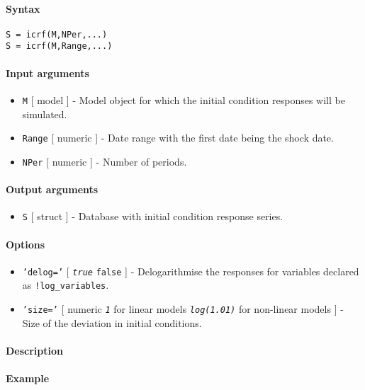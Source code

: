 


	\paragraph{Syntax}

\begin{verbatim}
S = icrf(M,NPer,...)
S = icrf(M,Range,...)
\end{verbatim}

\paragraph{Input arguments}

\begin{itemize}
\item
  \texttt{M} {[} model {]} - Model object for which the initial
  condition responses will be simulated.
\item
  \texttt{Range} {[} numeric {]} - Date range with the first date being
  the shock date.
\item
  \texttt{NPer} {[} numeric {]} - Number of periods.
\end{itemize}

\paragraph{Output arguments}

\begin{itemize}
\itemsep1pt\parskip0pt
\item
  \texttt{S} {[} struct {]} - Database with initial condition response
  series.
\end{itemize}

\paragraph{Options}

\begin{itemize}
\item
  \texttt{'delog='} {[} \emph{\texttt{true}} \textbar{} \texttt{false}
  {]} - Delogarithmise the responses for variables declared as
  \texttt{!log\_variables}.
\item
  \texttt{'size='} {[} numeric \textbar{} \emph{\texttt{1}} for linear
  models \textbar{} \emph{\texttt{log(1.01)}} for non-linear models {]}
  - Size of the deviation in initial conditions.
\end{itemize}

\paragraph{Description}

\paragraph{Example}


